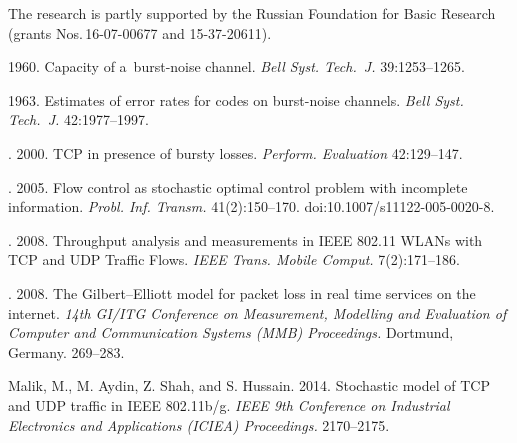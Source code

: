 
\vspace*{-12pt}

\Ack
\noindent
The research is partly supported by the Russian Foundation for Basic Research 
(grants Nos.\,16-07-00677 and 15-37-20611).



  \begin{multicols}{2}

\renewcommand{\bibname}{\protect\rmfamily References}

{\small\frenchspacing
 {%
 \begin{thebibliography}{99}

 1960. Capacity of a~burst-noise channel. 
\textit{Bell Syst. Tech.~J.} 39:1253--1265.

 1963. Estimates of error rates for codes on burst-noise channels. 
\textit{Bell Syst. Tech.~J.} 42:1977--1997.

. 2000. 
TCP in presence of bursty losses. \textit{Perform. Evaluation} 42:129--147.

. 2005. 
Flow control as stochastic optimal control
problem with incomplete information. \textit{Probl. Inf. Transm.} 
41(2):150--170. {doi:10.1007/s11122-005-0020-8.}

. 2008. 
Throughput analysis and measurements
in IEEE 802.11 WLANs with TCP and UDP Traffic Flows. 
\textit{IEEE Trans. Mobile Comput.} 7(2):171--186.

. 2008. 
The Gilbert--Elliott model for packet loss in
real time services on the internet. 
\textit{14th GI/ITG Conference on Measurement, Modelling and Evaluation of 
Computer and Communication Systems (MMB) Proceedings.} Dortmund, Germany. 269--283.

 Malik, M., M. Aydin, Z. Shah, and S. Hussain. 2014. 
Stochastic model of TCP and UDP traffic in IEEE 802.11b/g.
\textit{IEEE 9th Conference on Industrial Electronics and Applications (ICIEA) 
Proceedings.} 2170--2175.


\end{thebibliography}}}
\end{multicols}

